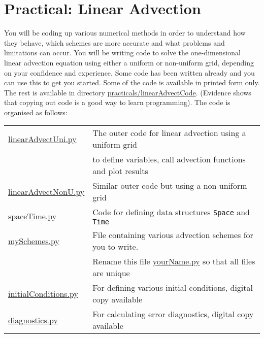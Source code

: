 %
\cleardoublepage{}


\section{Practical: Linear Advection}

You will be coding up various numerical methods in order to understand
how they behave, which schemes are more accurate and what problems
and limitations can occur. You will be writing code to solve the one-dimensional
linear advection equation using either a uniform or non-uniform grid,
depending on your confidence and experience. Some code has been written
already and you can use this to get you started. Some of the code
is available in printed form only. The rest is available in directory
\url{practicals/linearAdvectCode}. (Evidence shows that copying out
code is a good way to learn programming). The code is organised as
follows:

\begin{tabular}{ll}
\url{linearAdvectUni.py} & The outer code for linear advection using a uniform grid\tabularnewline
 & to define variables, call advection functions and plot results\tabularnewline
\url{linearAdvectNonU.py} & Similar outer code but using a non-uniform grid\tabularnewline
\url{spaceTime.py} & Code for defining data structures \texttt{Space} and \texttt{Time}\tabularnewline
\url{mySchemes.py} & File containing various advection schemes for you to write.\tabularnewline
 & Rename this file \url{yourName.py} so that all files are unique\tabularnewline
\url{initialConditions.py} & For defining various initial conditions, digital copy available\tabularnewline
\url{diagnostics.py} & For calculating error diagnostics, digital copy available\tabularnewline
\end{tabular}

